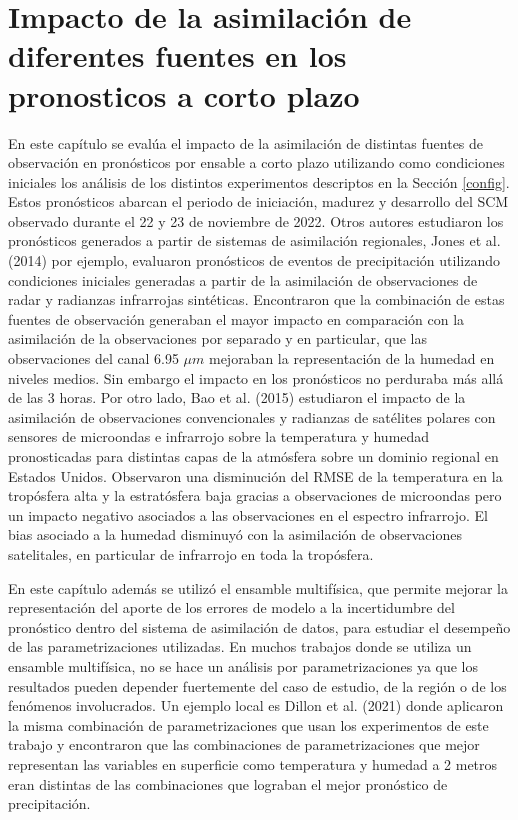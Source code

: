 \documentclass[12pt,oneside,a4paper]{reedthesis}
\begin{document}
\hypertarget{cap-4-pronosticos}{%
\chapter{Impacto de la asimilación de diferentes fuentes en los pronosticos a corto plazo}\label{cap-4-pronosticos}}

En este capítulo se evalúa el impacto de la asimilación de distintas fuentes de observación en pronósticos por ensable a corto plazo utilizando como condiciones iniciales los análisis de los distintos experimentos descriptos en la Sección \ref{config}. Estos pronósticos abarcan el periodo de iniciación, madurez y desarrollo del SCM observado durante el 22 y 23 de noviembre de 2022. Otros autores estudiaron los pronósticos generados a partir de sistemas de asimilación regionales, Jones et al. (2014) por ejemplo, evaluaron pronósticos de eventos de precipitación utilizando condiciones iniciales generadas a partir de la asimilación de observaciones de radar y radianzas infrarrojas sintéticas. Encontraron que la combinación de estas fuentes de observación generaban el mayor impacto en comparación con la asimilación de la observaciones por separado y en particular, que las observaciones del canal 6.95 \(\mu m\) mejoraban la representación de la humedad en niveles medios. Sin embargo el impacto en los pronósticos no perduraba más allá de las 3 horas. Por otro lado, Bao et al. (2015) estudiaron el impacto de la asimilación de observaciones convencionales y radianzas de satélites polares con sensores de microondas e infrarrojo sobre la temperatura y humedad pronosticadas para distintas capas de la atmósfera sobre un dominio regional en Estados Unidos. Observaron una disminución del RMSE de la temperatura en la tropósfera alta y la estratósfera baja gracias a observaciones de microondas pero un impacto negativo asociados a las observaciones en el espectro infrarrojo. El bias asociado a la humedad disminuyó con la asimilación de observaciones satelitales, en particular de infrarrojo en toda la tropósfera.

En este capítulo además se utilizó el ensamble multifísica, que permite mejorar la representación del aporte de los errores de modelo a la incertidumbre del pronóstico dentro del sistema de asimilación de datos, para estudiar el desempeño de las parametrizaciones utilizadas. En muchos trabajos donde se utiliza un ensamble multifísica, no se hace un análisis por parametrizaciones ya que los resultados pueden depender fuertemente del caso de estudio, de la región o de los fenómenos involucrados. Un ejemplo local es Dillon et al. (2021) donde aplicaron la misma combinación de parametrizaciones que usan los experimentos de este trabajo y encontraron que las combinaciones de parametrizaciones que mejor representan las variables en superficie como temperatura y humedad a 2 metros eran distintas de las combinaciones que lograban el mejor pronóstico de precipitación.
\end{document}
